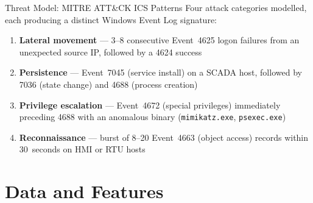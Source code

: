 \documentclass[aspectratio=169]{beamer}
\begin{document}
\begin{frame}{Threat Model: MITRE ATT\&CK ICS Patterns}
  Four attack categories modelled, each producing a distinct Windows Event Log signature:

  \vspace{0.6em}
  \begin{enumerate}
    \item \textbf{Lateral movement} --- 3--8 consecutive Event~4625 logon failures from an
          unexpected source IP, followed by a 4624 success

    \vspace{0.3em}
    \item \textbf{Persistence} --- Event~7045 (service install) on a SCADA host, followed
          by 7036 (state change) and 4688 (process creation)

    \vspace{0.3em}
    \item \textbf{Privilege escalation} --- Event~4672 (special privileges) immediately
          preceding 4688 with an anomalous binary (\texttt{mimikatz.exe},
          \texttt{psexec.exe})

    \vspace{0.3em}
    \item \textbf{Reconnaissance} --- burst of 8--20 Event~4663 (object access) records
          within 30~seconds on HMI or RTU hosts
  \end{enumerate}
\end{frame}

\section{Data and Features}
\end{document}
